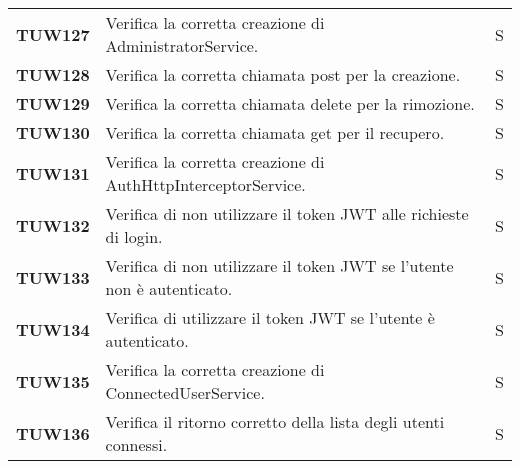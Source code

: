 \documentclass[../../piano-di-qualifica.tex]{subfiles}
\begin{document}
\begin{longtable}[H]{>{\centering\bfseries}m{3cm} >{}m{10cm} >{\centering\arraybackslash}m{3cm}}

  TUW127             & Verifica la corretta creazione di AdministratorService.                                                             & S                             \\

  TUW128             & Verifica la corretta chiamata post per la creazione.                                                                & S                             \\

  TUW129             & Verifica la corretta chiamata delete per la rimozione.                                                              & S                             \\

  TUW130             & Verifica la corretta chiamata get per il recupero.                                                                  & S                             \\


  TUW131             & Verifica la corretta creazione di AuthHttpInterceptorService.                                                       & S                             \\

  TUW132             & Verifica di non utilizzare il token JWT alle richieste di login.                                                    & S                             \\

  TUW133             & Verifica di non utilizzare il token JWT se l'utente non è autenticato.                                              & S                             \\

  TUW134             & Verifica di utilizzare il token JWT se l'utente è autenticato.                                                      & S                             \\


  TUW135             & Verifica la corretta creazione di ConnectedUserService.                                                             & S                             \\

  TUW136             & Verifica il ritorno corretto della lista degli utenti connessi.                                                     & S                             \\


\end{longtable}
\end{document}
